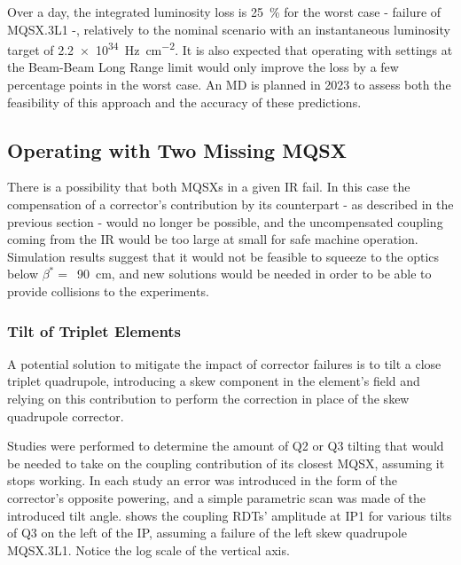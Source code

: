 Over a day, the integrated luminosity loss is \qty{25}{\percent} for the worst case - failure of MQSX.3L1 -, relatively to the nominal scenario with an instantaneous luminosity target of \qty{2.2e34}{\hertz\per\square\centi\meter}.
It is also expected that operating with settings at the Beam-Beam Long Range limit would only improve the loss by a few percentage points in the worst case.
An \gls{MD} is planned in \num{2023} to assess both the feasibility of this approach and the accuracy of these predictions.

\subsection{Operating with Two Missing MQSX}

There is a possibility that both MQSXs in a given \gls{IR} fail.
In this case the compensation of a corrector's contribution by its counterpart - as described in the previous section - would no longer be possible, and the uncompensated coupling coming from the IR would be too large at small  for safe machine operation.
Simulation results suggest that it would not be feasible to squeeze to the optics below \(\beta^{\ast} =\)~\qty{90}{\centi\meter}, and new solutions would be needed in order to be able to provide collisions to the experiments.

\subsubsection*{Tilt of Triplet Elements}

A potential solution to mitigate the impact of corrector failures is to tilt a close triplet quadrupole, introducing a \gls{skew} component in the element's field and relying on this contribution to perform the correction in place of the skew quadrupole corrector.

Studies were performed to determine the amount of Q\num{2} or Q\num{3} tilting that would be needed to take on the coupling contribution of its closest MQSX, assuming it stops working.
In each study an error was introduced in the form of the corrector's opposite powering, and a simple parametric scan was made of the introduced tilt angle.
 shows the coupling \glspl{RDT}' amplitude at IP\num{1} for various tilts of Q\num{3} on the left of the IP, assuming a failure of the left \gls{skew} quadrupole MQSX.\num{3}L\num{1}.
Notice the log scale of the vertical axis.


